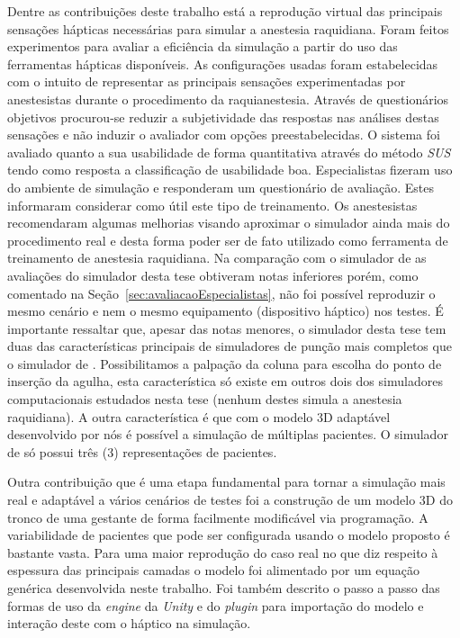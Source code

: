 Dentre as contribuições deste trabalho está a reprodução virtual das principais sensações hápticas necessárias para simular a anestesia raquidiana. Foram feitos experimentos para avaliar a eficiência da simulação a partir do uso das ferramentas hápticas disponíveis. As configurações usadas foram estabelecidas com o intuito de representar as principais sensações experimentadas por anestesistas durante o procedimento da raquianestesia. Através de questionários objetivos procurou-se reduzir a subjetividade das respostas nas análises destas sensações e não induzir o avaliador com opções preestabelecidas. O sistema foi avaliado quanto a sua usabilidade de forma quantitativa através do método \textit{\acrshort{SUS}} \cite{Brooke2013} tendo como resposta a classificação de usabilidade boa. Especialistas fizeram uso do ambiente de simulação e responderam um questionário de avaliação. Estes informaram considerar como útil este tipo de treinamento. Os anestesistas recomendaram algumas melhorias visando aproximar o simulador ainda mais do procedimento real e desta forma poder ser de fato utilizado como ferramenta de treinamento de anestesia raquidiana. Na comparação com o simulador de \textcite{Farber2008} as avaliações do simulador desta tese obtiveram notas inferiores porém, como comentado na Seção~\ref{sec:avaliacaoEspecialistas}, não foi possível reproduzir o mesmo cenário e nem o mesmo equipamento (dispositivo háptico) nos testes. É importante ressaltar que, apesar das notas menores, o simulador desta tese tem duas das características principais de simuladores de punção mais completos que o simulador de \textcite{Farber2008}. Possibilitamos a palpação da coluna para escolha do ponto de inserção da agulha, esta característica só existe em outros dois dos simuladores computacionais estudados nesta tese (nenhum destes simula a anestesia raquidiana). A outra característica é que com o modelo 3D adaptável desenvolvido por nós é possível a simulação de múltiplas pacientes. O simulador de \textcite{Farber2008} só possui três (3) representações de pacientes.

Outra contribuição que é uma etapa fundamental para tornar a simulação mais real e adaptável a vários cenários de testes foi a construção de um modelo 3D do tronco de uma gestante de forma facilmente modificável via programação. A variabilidade de pacientes que pode ser configurada usando o modelo proposto é bastante vasta. Para uma maior reprodução do caso real no que diz respeito à espessura das principais camadas o modelo foi alimentado por um equação genérica desenvolvida neste trabalho. Foi também descrito o passo a passo das formas de uso da \textit{engine} da \textit{Unity} e do \textit{plugin} para importação do modelo e interação deste com o háptico na simulação. 

